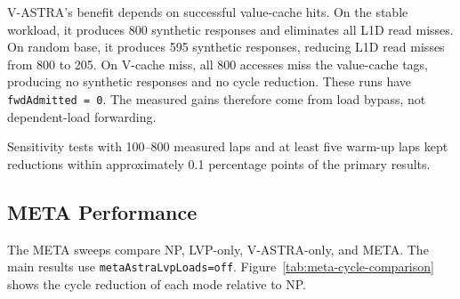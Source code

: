 V-ASTRA's benefit depends on successful value-cache hits. On the
stable workload, it produces 800 synthetic responses and eliminates
all L1D read misses. On random base, it produces 595 synthetic
responses, reducing L1D read misses from 800 to 205. On V-cache miss,
all 800 accesses miss the value-cache tags, producing no synthetic
responses and no cycle reduction. These runs have
\texttt{fwdAdmitted = 0}. The measured gains therefore come from
load bypass, not dependent-load forwarding.

Sensitivity tests with 100--800 measured laps and at least five
warm-up laps kept reductions within approximately 0.1 percentage
points of the primary results.

\subsection{META Performance}
\label{subsec:meta-performance}

The META sweeps compare NP, LVP-only, V-ASTRA-only, and META.
The main results use \texttt{metaAstraLvpLoads=off}. Figure~\ref{tab:meta-cycle-comparison}
shows the cycle reduction of each mode relative to NP.

